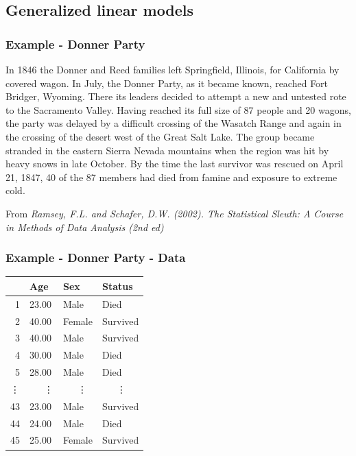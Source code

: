 
\subsection{Generalized linear models}


\begin{frame}
\frametitle{Example - Donner Party}

In 1846 the Donner and Reed families left Springfield, Illinois, for California by covered wagon. In July, the Donner Party, as it became known, reached Fort Bridger, Wyoming. There its leaders decided to attempt a new and untested rote to the Sacramento Valley. Having reached its full size of 87 people and 20 wagons, the party was delayed by a difficult crossing of the Wasatch Range and again in the crossing of the desert west of the Great Salt Lake. The group became stranded in the eastern Sierra Nevada mountains when the region was hit by heavy snows in late October. By the time the last survivor was rescued on April 21, 1847, 40 of the 87 members had died from famine and exposure to extreme cold.\\


\vfill

{\tiny From \textit{Ramsey, F.L. and Schafer, D.W. (2002). The Statistical Sleuth: A Course in Methods of Data Analysis (2nd ed)}}
\end{frame}



\begin{frame}
\frametitle{Example - Donner Party - Data}

\begin{center}
\begin{tabular}{rlll}
  \hline
     & Age   & Sex    & Status \\ 
  \hline
   1 & 23.00 & Male   & Died \\ 
   2 & 40.00 & Female & Survived \\ 
   3 & 40.00 & Male   & Survived \\ 
   4 & 30.00 & Male   & Died \\ 
   5 & 28.00 & Male   & Died \\ 
\vdots & ~~~\vdots & ~~~\vdots & ~~~\vdots \\
  43 & 23.00 & Male   & Survived \\ 
  44 & 24.00 & Male   & Died \\ 
  45 & 25.00 & Female & Survived \\ 
   \hline
\end{tabular}
\end{center}

\end{frame}

